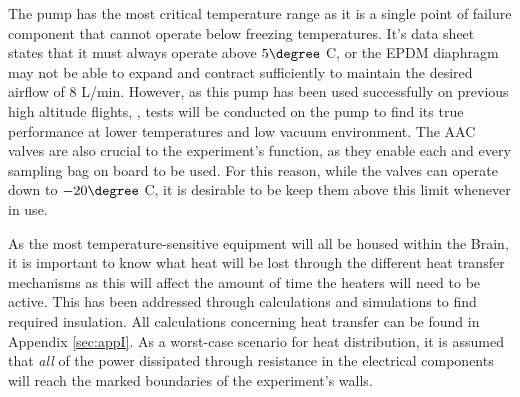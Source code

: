 \documentclass[a4paper,12pt,twoside]{article}
\begin{document}
The pump has the most critical temperature range as it is a single point of failure component that cannot operate below freezing temperatures. It's data sheet states that it must always operate above $5\degree$ C, or the EPDM diaphragm may not be able to expand and contract sufficiently to maintain the desired airflow of 8 L/min. However, as this pump has been used successfully on previous high altitude flights, \cite{LISA}, tests will be conducted on the pump to find its true performance at lower temperatures and low vacuum environment. The AAC valves are also crucial to the experiment's function, as they enable each and every sampling bag on board to be used. For this reason, while the valves can operate down to $-20\degree$ C, it is desirable to be keep them above this limit whenever in use.

As the most temperature-sensitive equipment will all be housed within the Brain, it is important to know what heat will be lost through the different heat transfer mechanisms as this will affect the amount of time the heaters will need to be active. This has been addressed through calculations and simulations to find required insulation. All calculations concerning heat transfer can be found in Appendix \ref{sec:appI}. As a worst-case scenario for heat distribution, it is assumed that \textit{all} of the power dissipated through resistance in the electrical components will reach the marked boundaries of the experiment's walls.
\end{document}
